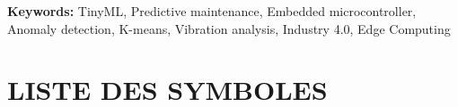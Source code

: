 \documentclass[oneside, french, a4paper, 12pt, reqno]{book}
\renewcommand\bibname{Bibliographie}
\begin{document}
\vspace{0.5cm}
\noindent\textbf{Keywords:} TinyML, Predictive maintenance, Embedded microcontroller, Anomaly detection, K-means, Vibration analysis, Industry 4.0, Edge Computing

\cleardoublepage
\renewcommand*\contentsname{TABLE DES MATIÈRES}
\begin{spacing}{1}
    \tableofcontents
\end{spacing}

\cleardoublepage
\renewcommand{\listtablename}{LISTE DES TABLEAUX}
\listoftables

\cleardoublepage
\renewcommand{\listfigurename}{LISTE DES FIGURES}
\listoffigures

\chapter*{LISTE DES SYMBOLES}
\thispagestyle{plain}

\cleardoublepage
\mainmatter  %
\setcounter{page}{1}    %





\cleardoublepage
\renewcommand{\bibname}{Bibliographie}


\end{document}
